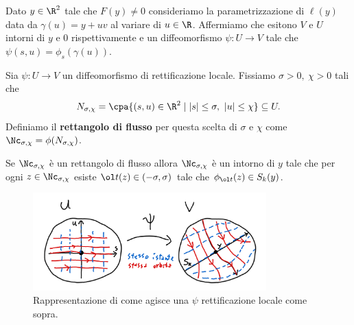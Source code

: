 \begin{lemma}\label{LemmaRettificazioneLocale}
Dato $y\in\R^2$ tale che $F(y)\neq 0$ consideriamo la parametrizzazione di $\ell(y)$ data da $\gamma(u)=y+uv$ al variare di $u\in\R$.
Affermiamo che esitono $V$ e $U$ intorni di $y$ e $0$ rispettivamente e un diffeomorfismo $\psi:U\to V$ tale che $\psi(s,u)=\phi_s(\gamma(u))$.
\end{lemma}

\begin{definition}
Sia $\psi:U\to V$ un diffeomorfismo di rettificazione locale. Fissiamo $\sigma>0,\ \chi>0$ tali che
\[N_{\sigma,\chi}=\cpa{(s,u)\in \R^2\mid |s|\leq \sigma,\ |u|\leq \chi}\subseteq U.\]
Definiamo il \textbf{rettangolo di flusso} per questa scelta di $\sigma$ e $\chi$ come $\Nc_{\sigma,\chi}=\phi(N_{\sigma,\chi})$.
\end{definition}

\begin{lemma}
Se $\Nc_{\sigma,\chi}$ \`e un rettangolo di flusso allora $\Nc_{\sigma,\chi}$ \`e un intorno di $y$ tale che per ogni $z\in \Nc_{\sigma,\chi}$ esiste $\ol t(z)\in (-\sigma,\sigma)$ tale che $\phi_{\ol t}(z)\in S_k(y)$.
\end{lemma}

\begin{figure}[!htb]
    \centering
    \includegraphics[width=9cm]{Immagini/rettificazione_locale.png}
    \caption{Rappresentazione di come agisce una $\psi$ rettificazione locale come sopra.}
\end{figure}


